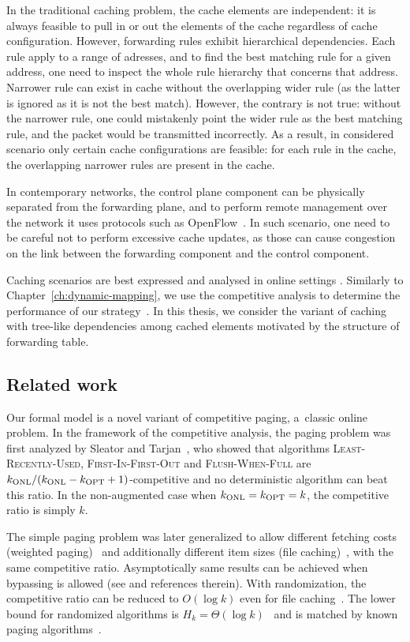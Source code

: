 In the traditional caching problem, the cache elements are independent: it is always feasible to pull in or out the elements of the cache regardless of cache configuration.
However, forwarding rules exhibit hierarchical dependencies.
Each rule apply to a range of adresses, and to find the best matching rule for a given address, one need to inspect the whole rule hierarchy that concerns that address.
Narrower rule can exist in cache without the overlapping wider rule (as the latter is ignored as it is not the best match).
However, the contrary is not true: without the narrower rule, one could mistakenly point the wider rule as the best matching rule, and the packet would be transmitted incorrectly.
As a result, in considered scenario only certain cache configurations are feasible: for each rule in the cache, the overlapping narrower rules are present in the cache.


In contemporary networks, the control plane component can be physically separated from the forwarding plane, and to perform remote management over the network it uses protocols such as OpenFlow~\cite{openflow}.
In such scenario, one need to be careful not to perform excessive cache updates, as those can cause congestion on the link between the forwarding component and the control component.

Caching scenarios are best expressed and analysed in online settings \cite{borodin-book}.
Similarly to Chapter~\ref{ch:dynamic-mapping}, we use the competitive analysis to determine the performance of our strategy~\cite{competitive-analysis}.
In this thesis, we consider the variant of caching with tree-like dependencies among cached elements motivated by the structure of forwarding table.

\subsection{Related work}

Our formal model is a novel variant of competitive paging, a~classic online
problem. In the framework of the competitive analysis, the paging problem was
first analyzed  by Sleator and Tarjan~\cite{competitive-analysis}, who showed
that algorithms \textsc{Least-Recently-Used}, \textsc{First-In-First-Out} and
\textsc{Flush-When-Full} are $k_\textnormal{ONL} / (k_\textnormal{ONL} - k_\textnormal{OPT} + 1)$-competitive 
and no deterministic algorithm can beat this ratio. In the non-augmented case
when $k_\textnormal{ONL} = k_\textnormal{OPT} = k$, the competitive ratio is simply $k$.

The simple paging problem was later generalized to allow different fetching
costs (weighted paging)~\cite{double-coverage,young-paging-greedy-dual} and
additionally different item sizes (file caching)~\cite{young-paging-landlord},
with the same competitive ratio. Asymptotically same results can be achieved
when bypassing is allowed (see \cite{caching-rejection-penalties,paging-irani}
and references therein). With randomization, the competitive ratio can be
reduced to $O(\log k)$ even for file caching~\cite{generalized-caching-optimal}. 
The lower bound for randomized algorithms is $H_k = 
\Theta(\log k)$~\cite{paging-mark} and is matched by known paging
algorithms~\cite{paging-optimal-easy,paging-optimal-difficult}.

